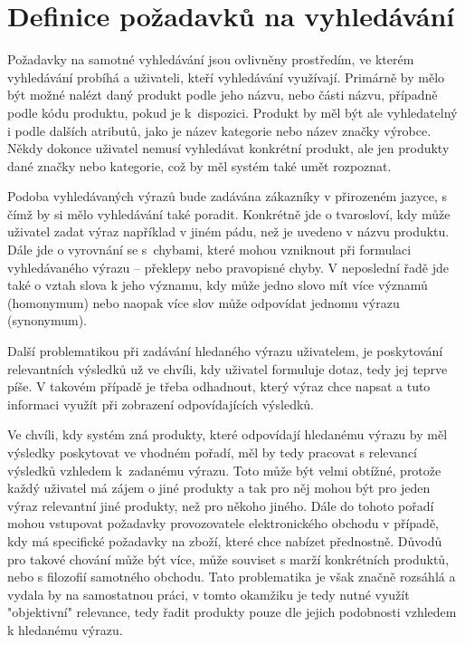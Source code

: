 \documentclass[FM,DP]{tulthesis}
\begin{document}
\section{Definice požadavků na vyhledávání} \label{ch:pozadavky-vyhledavani}

Požadavky na samotné vyhledávání jsou ovlivněny prostředím, ve kterém vyhledávání
probíhá a uživateli, kteří vyhledávání využívají. Primárně by mělo být možné
nalézt daný produkt podle jeho názvu, nebo části názvu, případně podle kódu produktu,
pokud je k~dispozici. Produkt by měl být ale vyhledatelný i podle dalších atributů, 
jako je název kategorie nebo název značky výrobce. Někdy dokonce uživatel nemusí
vyhledávat konkrétní produkt, ale jen produkty dané značky nebo kategorie, což by
měl systém také umět rozpoznat.

Podoba vyhledávaných výrazů bude zadávána zákazníky v přirozeném jazyce, s čímž by si mělo
vyhledávání také poradit. Konkrétně jde o tvarosloví, kdy může uživatel zadat výraz
například v jiném pádu, než je uvedeno v názvu produktu. Dále jde o vyrovnání se
s~chybami, které mohou vzniknout při formulaci vyhledávaného výrazu -- překlepy nebo
pravopisné chyby. V neposlední řadě jde také o vztah slova k jeho významu, kdy může
jedno slovo mít více významů (homonymum) nebo naopak více slov může odpovídat jednomu výrazu
(synonymum).

Další problematikou při zadávání hledaného výrazu uživatelem, je poskytování relevantních výsledků
už ve chvíli, kdy uživatel formuluje dotaz, tedy jej teprve píše. V takovém případě je třeba
odhadnout, který výraz chce napsat a tuto informaci využít při zobrazení odpovídajících
výsledků.

Ve chvíli, kdy systém zná produkty, které odpovídají hledanému výrazu by měl
výsledky poskytovat ve vhodném pořadí, měl by tedy pracovat s relevancí výsledků vzhledem 
k~zadanému výrazu. Toto může být velmi obtížné, protože každý uživatel má zájem o jiné
produkty a tak pro něj mohou být pro jeden výraz relevantní jiné produkty, než pro někoho
jiného. Dále do tohoto pořadí mohou vstupovat požadavky provozovatele elektronického obchodu
v případě, kdy má specifické požadavky na zboží, které chce nabízet přednostně. Důvodů
pro takové chování může být více, může souviset s marží konkrétních produktů, 
nebo s filozofií samotného obchodu. Tato problematika je však značně rozsáhlá a vydala by
na samostatnou práci, v tomto okamžiku je tedy nutné využít "objektivní" relevance, 
tedy řadit produkty pouze dle jejich podobnosti vzhledem k hledanému výrazu.
\end{document}
